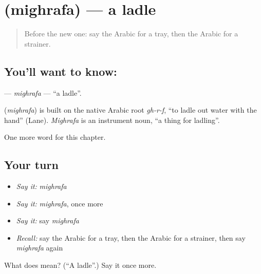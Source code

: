 \section[\texorpdfstring{\ar{مغرفة} (mighrafa)}{مغرفة (mighrafa)}]{ (mighrafa) — a ladle}

\label{lesson:AR-C278-mighrafa}



\begin{quote}
Before the new one: say the Arabic for a tray, then the Arabic for a strainer.
\end{quote}

\subsection*{You'll want to know: }
\textbf{} — \emph{mighrafa} — \textquotedblleft{}a ladle\textquotedblright{}.

\begin{cousinweb}
\textbf{} (\emph{mighrafa}) is built on the native Arabic root \emph{gh-r-f}, \textquotedblleft{}to ladle out water with the hand\textquotedblright{} (Lane). \emph{Mighrafa} is an instrument noun, \textquotedblleft{}a thing for ladling\textquotedblright{}.
\end{cousinweb}

\begin{grammarlens}[title={What you've built}]
One more word for this chapter.
\end{grammarlens}

\subsection*{Your turn}
\begin{itemize}
\raggedright
  \item \emph{Say it:} \emph{mighrafa}
  \item \emph{Say it:} \emph{mighrafa}, once more
  \item \emph{Say it:} say \emph{mighrafa}
  \item \emph{Recall:} say the Arabic for a tray, then the Arabic for a strainer, then say \emph{mighrafa} again
\end{itemize}

\begin{tcolorbox}[breakable,colback=teal!4,colframe=teal!35!black,title={Before you move on}]
What does  mean? (\textquotedblleft{}A ladle\textquotedblright{}.) Say it once more.
\end{tcolorbox}
